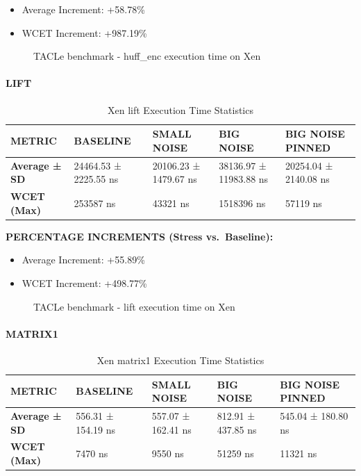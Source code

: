 \begin{itemize}
\item
  Average Increment: +58.78\%
\item
  WCET Increment: +987.19\%
\end{itemize}

\begin{figure}
\centering

\caption{TACLe benchmark - huff\_enc execution time on Xen}
\end{figure}

\paragraph{LIFT}\label{lift-1}

\begin{table}
\centering
\caption{Xen lift Execution Time Statistics}
\begin{tabularx}{\linewidth}{@{}YYYYY@{}}
\toprule
METRIC & BASELINE & SMALL NOISE & BIG NOISE & BIG NOISE PINNED\tabularnewline
\midrule
\textbf{Average ± SD} & 24464.53 ± 2225.55 ns & 20106.23 ± 1479.67 ns & 38136.97 ± 11983.88 ns & 20254.04 ± 2140.08 ns\tabularnewline
\textbf{WCET (Max)} & 253587 ns & 43321 ns & 1518396 ns & 57119 ns\tabularnewline
\bottomrule
\end{tabularx}
\end{table}

\textbf{PERCENTAGE INCREMENTS (Stress vs.~Baseline):}

\begin{itemize}
\item
  Average Increment: +55.89\%
\item
  WCET Increment: +498.77\%
\end{itemize}

\begin{figure}
\centering

\caption{TACLe benchmark - lift execution time on Xen}
\end{figure}

\paragraph{MATRIX1}\label{matrix1-1}

\begin{table}
\centering
\caption{Xen matrix1 Execution Time Statistics}
\begin{tabularx}{\linewidth}{@{}YYYYY@{}}
\toprule
METRIC & BASELINE & SMALL NOISE & BIG NOISE & BIG NOISE PINNED\tabularnewline
\midrule
\textbf{Average ± SD} & 556.31 ± 154.19 ns & 557.07 ± 162.41 ns & 812.91 ± 437.85 ns & 545.04 ± 180.80 ns\tabularnewline
\textbf{WCET (Max)} & 7470 ns & 9550 ns & 51259 ns & 11321 ns\tabularnewline
\bottomrule
\end{tabularx}
\end{table}

